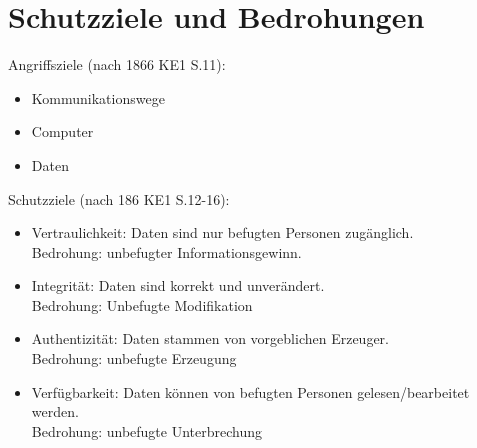 \section*{Schutzziele und Bedrohungen}

Angriffsziele (nach 1866 KE1 S.11):

\begin{itemize}
  \item Kommunikationswege
  \item Computer
  \item Daten
\end{itemize}
Schutzziele (nach 186 KE1 S.12-16):

\begin{itemize}
  \item Vertraulichkeit: Daten sind nur befugten Personen zugänglich. \\
  Bedrohung: unbefugter Informationsgewinn.
  \item Integrität: Daten sind korrekt und unverändert. \\ Bedrohung: Unbefugte Modifikation
  \item Authentizität: Daten stammen von vorgeblichen Erzeuger. \\
  Bedrohung: unbefugte Erzeugung
  \item Verfügbarkeit: Daten können von befugten Personen gelesen/bearbeitet werden. \\
  	Bedrohung: unbefugte Unterbrechung
\end{itemize}

